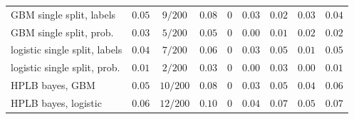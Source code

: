 \begin{tabular}{lcccccccc}
GBM single split, labels & $0.05$ & $9/200$ & $0.08$ & $0$ & $0.03$ & $0.02$ & $0.03$ & $0.04$ \\
GBM single split, prob. & $0.03$ & $5/200$ & $0.05$ & $0$ & $0.00$ & $0.01$ & $0.02$ & $0.02$ \\
logistic single split, labels & $0.04$ & $7/200$ & $0.06$ & $0$ & $0.03$ & $0.05$ & $0.01$ & $0.05$ \\
logistic single split, prob. & $0.01$ & $2/200$ & $0.03$ & $0$ & $0.00$ & $0.03$ & $0.00$ & $0.01$ \\
HPLB bayes, GBM & $0.05$ & $10/200$ & $0.08$ & $0$ & $0.03$ & $0.05$ & $0.04$ & $0.06$ \\
HPLB bayes, logistic & $0.06$ & $12/200$ & $0.10$ & $0$ & $0.04$ & $0.07$ & $0.05$ & $0.07$ \\
\bottomrule
\end{tabular}
